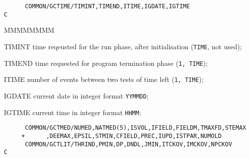 \begin{verbatim}
      COMMON/GCTIME/TIMINT,TIMEND,ITIME,IGDATE,IGTIME
C
\end{verbatim}
\begin{DLtt}{MMMMMMMM}
\item[TIMINT] time reqeusted for the run phase, 
after initialisation  ({\tt TIME}, not used);
\item[TIMEND] time requested
for program termination phase ({\tt 1, TIME});
\item[ITIME] number of events between two tests of time left
({\tt 1, TIME});
\item[IGDATE]current date in integer format {\tt YYMMDD};
\item[IGTIME] current time in integer format {\tt HHMM};
\end{DLtt}
\begin{verbatim}
      COMMON/GCTMED/NUMED,NATMED(5),ISVOL,IFIELD,FIELDM,TMAXFD,STEMAX
     +      ,DEEMAX,EPSIL,STMIN,CFIELD,PREC,IUPD,ISTPAR,NUMOLD
      COMMON/GCTLIT/THRIND,PMIN,DP,DNDL,JMIN,ITCKOV,IMCKOV,NPCKOV
C
\end{verbatim}

